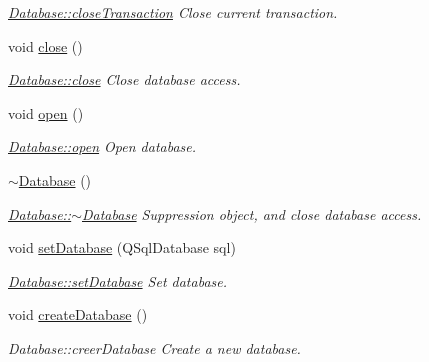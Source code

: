 \begin{DoxyCompactItemize}
\begin{DoxyCompactList}\small\item\em \hyperlink{classDatabase_a8322990bcba006d0d82ac069ad6e0307}{Database\+::close\+Transaction} Close current transaction. \end{DoxyCompactList}\item 
\hypertarget{classDatabase_ab89cb07242f0ab1d4058974bf3e7cf19}{void \hyperlink{classDatabase_ab89cb07242f0ab1d4058974bf3e7cf19}{close} ()}\label{classDatabase_ab89cb07242f0ab1d4058974bf3e7cf19}

\begin{DoxyCompactList}\small\item\em \hyperlink{classDatabase_ab89cb07242f0ab1d4058974bf3e7cf19}{Database\+::close} Close database access. \end{DoxyCompactList}\item 
\hypertarget{classDatabase_a0d0134e05c8f2dc4fcbbb2f36c02a779}{void \hyperlink{classDatabase_a0d0134e05c8f2dc4fcbbb2f36c02a779}{open} ()}\label{classDatabase_a0d0134e05c8f2dc4fcbbb2f36c02a779}

\begin{DoxyCompactList}\small\item\em \hyperlink{classDatabase_a0d0134e05c8f2dc4fcbbb2f36c02a779}{Database\+::open} Open database. \end{DoxyCompactList}\item 
\hypertarget{classDatabase_a84d399a2ad58d69daab9b05330e1316d}{\hyperlink{classDatabase_a84d399a2ad58d69daab9b05330e1316d}{$\sim$\+Database} ()}\label{classDatabase_a84d399a2ad58d69daab9b05330e1316d}

\begin{DoxyCompactList}\small\item\em \hyperlink{classDatabase_a84d399a2ad58d69daab9b05330e1316d}{Database\+::$\sim$\+Database} Suppression object, and close database access. \end{DoxyCompactList}\item 
void \hyperlink{classDatabase_a8b03d7f4a92325b9e519fd3f8a2e245c}{set\+Database} (Q\+Sql\+Database sql)
\begin{DoxyCompactList}\small\item\em \hyperlink{classDatabase_a8b03d7f4a92325b9e519fd3f8a2e245c}{Database\+::set\+Database} Set database. \end{DoxyCompactList}\item 
\hypertarget{classDatabase_a2dc260583a49889bed8097e21953594e}{void \hyperlink{classDatabase_a2dc260583a49889bed8097e21953594e}{create\+Database} ()}\label{classDatabase_a2dc260583a49889bed8097e21953594e}

\begin{DoxyCompactList}\small\item\em Database\+::creer\+Database Create a new database. \end{DoxyCompactList}\end{DoxyCompactItemize}
